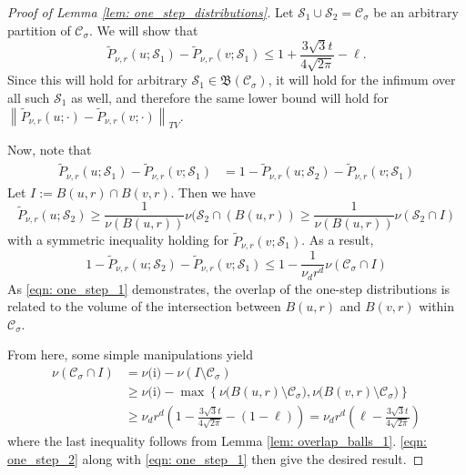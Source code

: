 \documentclass[11pt,twoside]{article}
\newcommand{\set}[1]{\left\{#1\right\}}
\newcommand{\norm}[1]{\left\lVert#1\right\rVert}
\newcommand{\1}{\mathbf{1}}
\newcommand{\Sset}{\mathcal{S}}
\newcommand{\Cset}{\mathcal{C}}
\newcommand{\Csig}{\Cset_{\sigma}}
\begin{document}
\begin{proof}[Proof of Lemma \ref{lem: one_step_distributions}]
	Let $\Sset_1 \cup \Sset_2 = \Csig$ be an arbitrary partition of $\Csig$. We will show that 
	\begin{equation*}
	\widetilde{P}_{\nu,r}(u; \Sset_1) - \widetilde{P}_{\nu,r}(v; \Sset_1) \leq 1 + \frac{3 \sqrt{3} t}{4\sqrt{2\pi}} - \ell.
	\end{equation*}
	Since this will hold for arbitrary $\Sset_1 \in \mathfrak{B}(\Csig)$, it will hold for the infimum over all such $\Sset_1$ as well, and therefore the same lower bound will hold for $\norm{\widetilde{P}_{\nu,r}(u; \cdot) - \widetilde{P}_{\nu,r}(v; \cdot)}_{TV}$.
	
	Now, note that
	\begin{align*}
	\widetilde{P}_{\nu,r}(u; \Sset_1) - \widetilde{P}_{\nu,r}(v; \Sset_1) & = 1 - \widetilde{P}_{\nu,r}(u; \Sset_2) - \widetilde{P}_{\nu,r}(v; \Sset_1)
	\end{align*}
	Let $I := B(u,r) \cap B(v,r)$. Then we have
	\begin{equation*}
	\widetilde{P}_{\nu,r}(u; \Sset_2) \geq \frac{1}{\nu(B(u,r))} \nu(\Sset_2 \cap (B(u,r)) \geq \frac{1}{\nu(B(u,r))} \nu(\Sset_2 \cap I)
	\end{equation*}
	with a symmetric inequality holding for $\widetilde{P}_{\nu,r}(v; \Sset_1)$. As a result,
	\begin{equation}
	1 - \widetilde{P}_{\nu,r}(u; \Sset_2) - \widetilde{P}_{\nu,r}(v; \Sset_1) \leq 1 - \frac{1}{\nu_d r^d} \nu(\Csig \cap I) \label{eqn: one_step_1}
	\end{equation}
	As \eqref{eqn: one_step_1} demonstrates, the overlap of the one-step distributions is related to the volume of the intersection between $B(u,r)$ and $B(v,r)$ within $\Csig$.
	
	From here, some simple manipulations yield
	\begin{align}
	\nu(\Csig \cap I)  & = \nu\text{(i)} - \nu(I \setminus \Csig) \nonumber \\
	& \geq \nu\text{(i)} - \max \set{\nu\bigl(B(u,r) \setminus \Csig\bigr), \nu\bigl(B(v,r) \setminus \Csig\bigr)} \nonumber \\
	& \geq \nu_d r^d \left(1 - \frac{3 \sqrt{3} t}{4\sqrt{2\pi}} - (1 -\ell) \label{eqn: one_step_2} \right) = \nu_d r^d\left(\ell - \frac{3 \sqrt{3} t}{4\sqrt{2\pi}}\right)
	\end{align}
	where the last inequality follows from Lemma \ref{lem: overlap_balls_1}. \eqref{eqn: one_step_2} along with \eqref{eqn: one_step_1} then give the desired result.
\end{proof}
\end{document}
